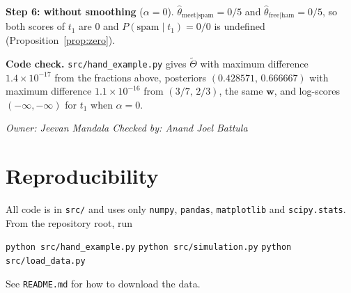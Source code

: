 \documentclass[11pt]{article}
\newcommand{\owner}[2]{\par\noindent\textit{Owner: #1 \hfill Checked by: #2}\par\medskip}
\theoremstyle{plain}
\theoremstyle{definition}
\newcommand{\bw}{\mathbf{w}}
\begin{document}
\textbf{Step 6: without smoothing} ($\alpha=0$). $\hat\theta_{\text{meet}\mid\text{spam}}=0/5$ and
$\hat\theta_{\text{free}\mid\text{ham}}=0/5$, so both scores of $t_1$ are 0 and
$P(\text{spam}\mid t_1)=0/0$ is undefined (Proposition~\ref{prop:zero}).

\textbf{Code check.} \texttt{src/hand\_example.py} gives $\tilde\Theta$ with maximum difference
$1.4\times10^{-17}$ from the fractions above, posteriors $(0.428571,\,0.666667)$ with maximum
difference $1.1\times10^{-16}$ from $(3/7,\,2/3)$, the same $\bw$, and log-scores
$(-\infty,-\infty)$ for $t_1$ when $\alpha=0$.
\owner{Jeevan Mandala}{Anand Joel Battula}

\section{Reproducibility}
All code is in \texttt{src/} and uses only \texttt{numpy}, \texttt{pandas}, \texttt{matplotlib}
and \texttt{scipy.stats}. From the repository root, run
\begin{center}
\texttt{python src/hand\_example.py}\qquad
\texttt{python src/simulation.py}\qquad
\texttt{python src/load\_data.py}
\end{center}
See \texttt{README.md} for how to download the data.
\end{document}

